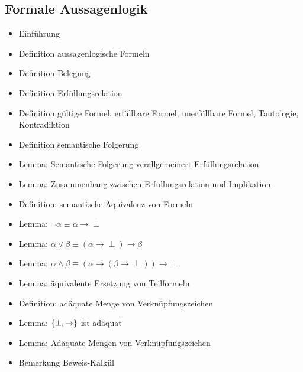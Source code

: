 \documentclass[8pt,fleqn,a4paper,twoside]{article}
\begin{document}
\begin{multicols}{2}
    \subsection{Formale Aussagenlogik} %
    \label{sub:formale_aussagenlogik}
      \begin{itemize}
        \item Einführung
        \item Definition aussagenlogische Formeln
        \item Definition Belegung
        \item Definition Erfüllungsrelation
        \item Definition gültige Formel, erfüllbare Formel, unerfüllbare Formel, Tautologie, Kontradiktion
        \item Definition semantische Folgerung
        \item Lemma: Semantische Folgerung verallgemeinert Erfüllungsrelation
        \item Lemma: Zusammenhang zwischen Erfüllungsrelation und Implikation
        \item Definition: semantische Äquivalenz von Formeln
        \item Lemma: $\lnot α\equiv α\to \perp$
        \item Lemma: $α\lor β \equiv (α\to\perp)\to β$
        \item Lemma: $α\land β \equiv (α\to(β\to\perp))\to\perp$
        \item Lemma: äquivalente Ersetzung von Teilformeln
        \item Definition: adäquate Menge von Verknüpfungszeichen
        \item Lemma: $\set{\perp,\to}{}$ ist adäquat
        \item Lemma: Adäquate Mengen von Verknüpfungszeichen
        \item Bemerkung Beweis-Kalkül
      \end{itemize}


\end{multicols}
\end{document}
